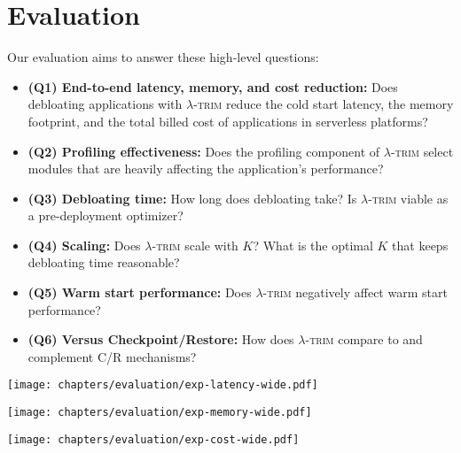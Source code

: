 \documentclass[sigplan,screen]{acmart}
\newenvironment{vinlist}
{\begin{itemize}[leftmargin=1.5em]
  \setlength{\itemsep}{0pt}
  \setlength{\labelwidth}{0.75em}
\setlength{\parsep}{0pt}
\setlength{\topsep}{0pt}
  \setlength{\partopsep}{0pt}
  }
{\end{itemize}}
\newcommand{\sys}{\textsc{\ensuremath{\lambda}-trim}\xspace}
\begin{document}
\section{Evaluation}





Our evaluation aims to answer these high-level questions:
\begin{vinlist}

\item \textbf{(Q1) End-to-end latency, memory, and cost reduction:} Does debloating applications with \sys reduce the cold start latency, the memory footprint, and the total billed cost of applications in serverless platforms?

\item \textbf{(Q2) Profiling effectiveness:} Does the profiling component of \sys select modules that are heavily affecting the application's performance?

\item \textbf{(Q3) Debloating time:} How long does debloating take? 
Is \sys viable as a pre-deployment optimizer? 

\item \textbf{(Q4) Scaling:} Does \sys scale with $K$?
What is the optimal $K$ that keeps debloating time reasonable?

\item \textbf{(Q5) Warm start performance:} Does \sys negatively affect warm start performance?

\item \textbf{(Q6) Versus Checkpoint/Restore:} How does \sys compare to and complement C/R mechanisms? 


\end{vinlist}


\begin{figure*}[t]
  \centering
    \texttt{[image: chapters/evaluation/exp-latency-wide.pdf]}
    
    \vspace{-0.3em}
    
    \texttt{[image: chapters/evaluation/exp-memory-wide.pdf]}
    
    \vspace{-0.3em}
    
    \texttt{[image: chapters/evaluation/exp-cost-wide.pdf]}

\vspace{-0.7em}
  \caption{\sys's improvements to latency, memory footprint, and monetary cost for our benchmarked applications.
  The left axis and bars show the results for the original and trimmed versions.
  For latency, we show a breakdown of E2E versus Function Initialization time.
  The right axis and line graph show the relative improvement of \sys.
  The dashed line helps illustrate the speedup or improvement against the original application.}
  \label{fig:principal}
\end{figure*}
\end{document}
